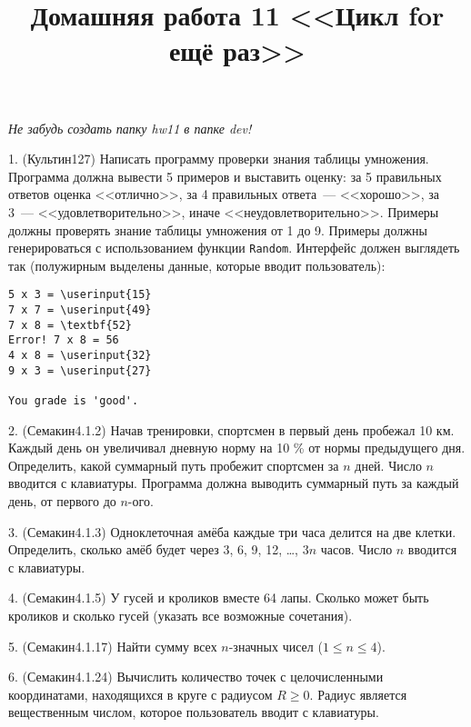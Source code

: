 \documentclass[12pt,a4paper,draft]{article}
\title{Домашняя работа 11 <<Цикл for ещё раз>>}
\date{}
\newcommand\userinput[1]{\textbf{#1}}
\begin{document}
\maketitle{}

\emph{Не забудь создать папку hw11 в папке dev!}

1. (Культин127) Написать программу проверки знания таблицы умножения. Программа
должна вывести 5 примеров и выставить оценку: за 5 правильных ответов оценка
<<отлично>>, за 4 правильных ответа~--- <<хорошо>>, за 3~---
<<удовлетворительно>>, иначе <<неудовлетворительно>>. Примеры должны проверять
знание таблицы умножения от 1 до 9. Примеры должны генерироваться с
использованием функции \foreignlanguage{english}{\texttt{Random}}. Интерфейс
должен выглядеть так (полужирным выделены данные, которые вводит пользователь):

\begin{Verbatim}[commandchars=\\\{\}]
5 x 3 = \userinput{15}
7 x 7 = \userinput{49}
7 x 8 = \textbf{52}
Error! 7 x 8 = 56
4 x 8 = \userinput{32}
9 x 3 = \userinput{27}

You grade is 'good'.
\end{Verbatim}

2. (Семакин4.1.2) Начав тренировки, спортсмен в первый день пробежал 10 км.
Каждый день он увеличивал дневную норму на 10 \% от нормы предыдущего дня.
Определить, какой суммарный путь пробежит спортсмен за $n$ дней. Число $n$
вводится с клавиатуры. Программа должна выводить суммарный путь за каждый
день, от первого до $n$-ого.

3. (Семакин4.1.3) Одноклеточная амёба каждые три часа делится на две клетки.
Определить, сколько амёб будет через 3, 6, 9, 12, \dots, $3n$ часов. Число $n$
вводится с клавиатуры.

4. (Семакин4.1.5) У гусей и кроликов вместе 64 лапы. Сколько может быть
кроликов и сколько гусей (указать все возможные сочетания).

5. (Семакин4.1.17) Найти сумму всех $n$-значных чисел ($1 \leq n \leq 4$).

6. (Семакин4.1.24) Вычислить количество точек с целочисленными координатами,
находящихся в круге с радиусом $R \geq 0 $. Радиус является вещественным
числом, которое пользователь вводит с клавиатуры.
\end{document}
